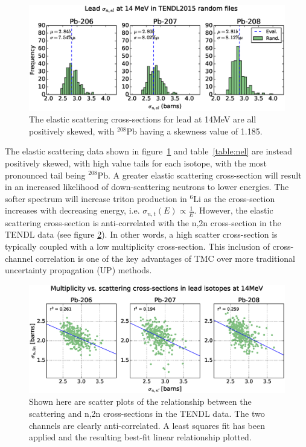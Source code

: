 \begin{figure}[H]
  \includegraphics[width=\textwidth]{pb_tendl_nel_hist}
  \caption[Histograms of $^{208}$Pb(n,el)$^{208}$Pb data in TENDL2015.]{The elastic scattering cross-sections for lead at 14MeV are all positively skewed, with $^{208}$Pb having a skewness value of 1.185.}
  \label{fig:tendl_nel}
\end{figure}

The elastic scattering data shown in figure~\ref{fig:tendl_nel} and table~\ref{table:nel} are instead positively skewed, with high value tails for each isotope, with the most pronounced tail being $^{208}$Pb. A greater elastic scattering cross-section will result in an increased likelihood of down-scattering neutrons to lower energies. The softer spectrum will increase triton production in $^{6}$Li as the cross-section increases with decreasing energy, i.e. $\sigma_{n,t}(E) \propto \frac{1}{E}$. However, the elastic scattering cross-section is anti-correlated with the n,2n cross-section in the TENDL data (see figure \ref{fig:pb_el_n2n_corr}). In other words, a high scatter cross-section is typically coupled with a low multiplicity cross-section. This inclusion of cross-channel correlation is one of the key advantages of TMC over more traditional uncertainty propagation (UP) methods. 


\begin{figure}[H]
	\includegraphics[width=\textwidth]{pb_el_n2n_corr}
  \caption[Correlation between elastic and (n,2n) channels in Pb.]{Shown here are scatter plots of the relationship between the scattering and n,2n cross-sections in the TENDL data. The two channels are clearly anti-correlated. A least squares fit has been applied and the resulting best-fit linear relationship plotted.}
	\label{fig:pb_el_n2n_corr}
\end{figure}

